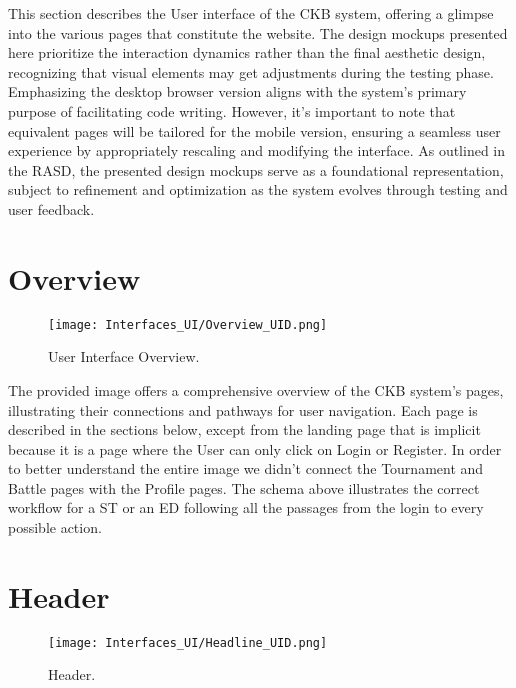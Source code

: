 This section describes the User interface of the CKB system, offering a glimpse into the various pages that constitute the website. The design mockups presented here prioritize the interaction dynamics rather than the final aesthetic design, recognizing that visual elements may get adjustments during the testing phase. Emphasizing the desktop browser version aligns with the system's primary purpose of facilitating code writing. However, it's important to note that equivalent pages will be tailored for the mobile version, ensuring a seamless user experience by appropriately rescaling and modifying the interface. As outlined in the RASD, the presented design mockups serve as a foundational representation, subject to refinement and optimization as the system evolves through testing and user feedback.

\section{Overview}

\begin{figure}[H]
    \begin{center}
        \texttt{[image: Interfaces\_UI/Overview\_UID.png]}
        \caption{User Interface Overview.}
        \label{fig:user_interface_overview}%
    \end{center}
\end{figure}

The provided image offers a comprehensive overview of the CKB system's pages, illustrating  their connections and pathways for user navigation. Each page is described in the sections below, except from the landing page that is implicit because it is a page where the User can only click on Login or Register. In order to better understand the entire image we didn’t connect the Tournament and Battle pages with the Profile pages. The schema above illustrates the correct workflow for a ST or an ED following all the passages from the login to every possible action.

\section{Header}

\begin{figure}[H]
    \begin{center}
        \texttt{[image: Interfaces\_UI/Headline\_UID.png]}
        \caption{Header.}
        \label{fig:header}%
    \end{center}
\end{figure}

